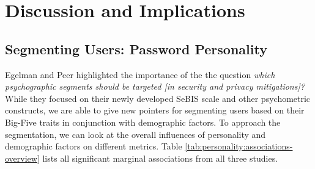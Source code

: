 






\section{Discussion and Implications}


\subsection{Segmenting Users: Password Personality}
Egelman and Peer highlighted the importance of the the question \textit{which psychographic segments should be targeted [in security and privacy mitigations]?} While they focused on their newly developed SeBIS scale and other psychometric constructs, we are able to give new pointers for segmenting users based on their Big-Five traits in conjunction with demographic factors. To approach the segmentation, we can look at the overall influences of personality and demographic factors on different metrics. Table \ref{tab:personality:associations-overview} lists all significant marginal associations from all three studies. 

